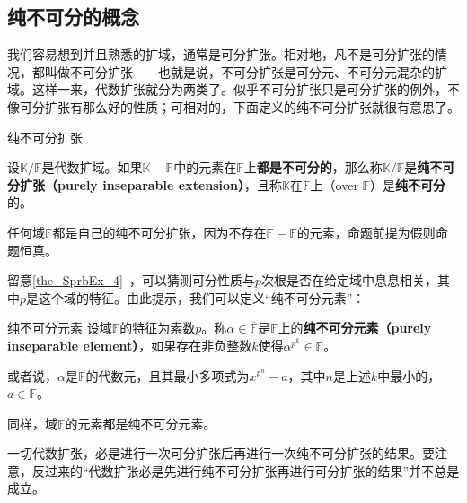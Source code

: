 


\subsection{纯不可分的概念}

我们容易想到并且熟悉的扩域，通常是可分扩张。相对地，凡不是可分扩张的情况，都叫做不可分扩张——也就是说，不可分扩张是可分元、不可分元混杂的扩域。这样一来，代数扩张就分为两类了。似乎不可分扩张只是可分扩张的例外，不像可分扩张有那么好的性质；可相对的，下面定义的纯不可分扩张就很有意思了。

\begin{definition}{纯不可分扩张}\label{def_PInsEx_2}

设$\mathbb{K}/\mathbb{F}$是代数扩域。如果$\mathbb{K}-\mathbb{F}$中的元素在$\mathbb{F}$上\textbf{都是不可分的}，那么称$\mathbb{K}/\mathbb{F}$是\textbf{纯不可分扩张（purely inseparable extension）}，且称$\mathbb{K}$在$\mathbb{F}$上（over $\mathbb{F}$）是\textbf{纯不可分}的。

\end{definition}

任何域$\mathbb{F}$都是自己的纯不可分扩张，因为不存在$\mathbb{F}-\mathbb{F}$的元素，命题前提为假则命题恒真。

留意\autoref{the_SprbEx_4}~，可以猜测可分性质与$p$次根是否在给定域中息息相关，其中$p$是这个域的特征。由此提示，我们可以定义“纯不可分元素”：


\begin{definition}{纯不可分元素}\label{def_PInsEx_1}
设域$\mathbb{F}$的特征为素数$p$。称$\alpha\in\overline{\mathbb{F}}$是$\mathbb{F}$上的\textbf{纯不可分元素（purely inseparable element）}，如果存在非负整数$k$使得$\alpha^{p^k}\in\mathbb{F}$。

或者说，$\alpha$是$\mathbb{F}$的代数元，且其最小多项式为$x^{p^n}-a$，其中$n$是上述$k$中最小的，$a\in\mathbb{F}$。
\end{definition}

同样，域$\mathbb{F}$的元素都是纯不可分元素。



一切代数扩张，必是进行一次可分扩张后再进行一次纯不可分扩张的结果。要注意，反过来的“代数扩张必是先进行纯不可分扩张再进行可分扩张的结果”并不总是成立。




